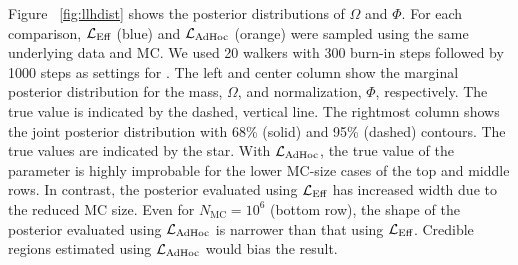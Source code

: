 Figure ~\ref{fig:llhdist} shows the posterior distributions of $\Omega$ and $\Phi$.
For each comparison, $\mathcal{L}_\textmd{Eff}$ (blue) and $\mathcal{L}_{\textmd{AdHoc}}$ (orange) were sampled using the same underlying data and MC.
We used 20 walkers with 300 burn-in steps followed by 1000 steps as settings for \emcee.
The left and center column show the marginal posterior distribution for the mass, $\Omega$, and normalization, $\Phi$, respectively.
The true value is indicated by the dashed, vertical line.
The rightmost column shows the joint posterior distribution with 68\% (solid) and 95\% (dashed) contours.
The true values are indicated by the star.
With $\mathcal{L}_{\textmd{AdHoc}}$, the true value of the parameter is highly improbable for the lower MC-size cases of the top and middle rows.
In contrast, the posterior evaluated using $\mathcal{L}_\textmd{Eff}$ has increased width due to the reduced MC size.
Even for $N_\mathrm{MC}=10^6$ (bottom row), the shape of the posterior evaluated using $\mathcal{L}_{\textmd{AdHoc}}$ is narrower than that using $\mathcal{L}_\textmd{Eff}$.
Credible regions estimated using $\mathcal{L}_{\textmd{AdHoc}}$ would bias the result.

